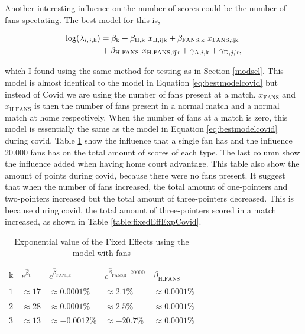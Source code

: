 \noindent Another interesting influence on the number of scores could be the number of fans spectating. The best model for this is,

\begin{equation}
\begin{aligned}
    \log(\lambda_{i,j,\text{k}}) &= \beta_\text{k} + \beta_{\text{H},\text{k}} \ x_\text{H,ij\text{k}} + \beta_{\text{FANS},\text{k}} \ x_\text{FANS,ij\text{k}} \\
    &+ \beta_\text{H.FANS} \ x_\text{H.FANS,ij\text{k}} + \gamma_{\text{A},i,\text{k}} + \gamma_{\text{D},j,\text{k}},
\label{eq:bestmodelfans}
\end{aligned}
\end{equation}

\noindent which I found using the same method for testing as in Section \ref{modsel}. This model is almost identical to the model in Equation \ref{eq:bestmodelcovid} but instead of Covid we are using the number of fans present at a match. $x_\text{FANS}$ and $x_\text{H.FANS}$ is then the number of fans present in a normal match and a normal match at home respectively. When the number of fans at a match is zero, this model is essentially the same as the model in Equation \ref{eq:bestmodelcovid} during covid. Table \ref{table:fixedEffExpFans} show the influence that a single fan has and the influence $20.000$ fans has on the total amount of scores of each type. The last column show the influence added when having home court advantage. This table also show the amount of points during covid, because there were no fans present. It suggest that when the number of fans increased, the total amount of one-pointers and two-pointers increased but the total amount of three-pointers decreased. This is because during covid, the total amount of three-pointers scored in a match increased, as shown in Table \ref{table:fixedEffExpCovid}.

\begin{table}[!ht]
\centering
\begin{tabular}{ |p{.5cm}|p{2cm}|p{3cm}|p{2cm}|p{2cm}| }
    \hline
    $\text{k}$ & $e^{\hat\beta_\text{k}}$ & $e^{\hat\beta_{\text{FANS},\text{k}}}$ & $e^{\hat\beta_{\text{FANS},\text{k}} \cdot 20000}$ & $\beta_\text{H.FANS}$ \\
    \hline
    $1$ & $\approx 17$ & $\approx 0.0001\%$ & $\approx 2.1\%$ & $\approx 0.0001\%$ \\
    $2$ & $\approx 28$ & $\approx 0.0001\%$ & $\approx 2.5\%$ & $\approx 0.0001\%$ \\
    $3$ & $\approx 13$ & $\approx -0.0012\%$ & $\approx -20.7\%$ & $\approx 0.0001\%$ \\
    \hline
\end{tabular}
\caption{Exponential value of the Fixed Effects using the model with fans}
\label{table:fixedEffExpFans}
\end{table}

